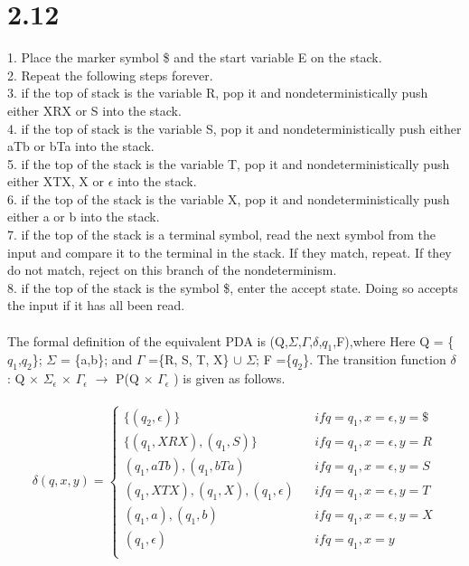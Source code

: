 \documentclass{scrartcl}
\begin{document}
\section*{2.12}
1. Place the marker symbol \$ and the start variable E on the stack.\\
2. Repeat the following steps forever. \\
3. if the top of stack is the variable R, pop it and nondeterministically push either XRX or S into the stack.\\
4. if the top of stack is the variable S, pop it and nondeterministically push either aTb or bTa into the stack.\\ 
5. if the top of the stack is the variable T, pop it and nondeterministically push either XTX, X or $\epsilon$ into the stack.\\
6. if the top of the stack is the variable X, pop it and nondeterministically push either a or b into the stack.\\
7. if the top of the stack is a terminal symbol, read the next symbol from the input and compare it to the terminal in the stack. If they match, repeat. If they do not match, reject on this branch of the nondeterminism.\\
8. if the top of the stack is the symbol \$, enter the accept state. Doing so accepts the input if it has all been read.\\
\\

The formal definition of the equivalent PDA is (Q,$\Sigma$,$\Gamma$,$\delta$,$q_1$,F),where Here Q = \{$q_1$,$q_2$\}; $\Sigma$ = \{a,b\}; and $\Gamma$ =\{R, S, T, X\} $\cup$ $\Sigma$; F =\{$q_2$\}. The transition function $\delta$ : Q $\times$ ${\Sigma}_\epsilon$  $\times$ $\Gamma_\epsilon$ $\rightarrow$ P(Q $\times$ $\Gamma_\epsilon$ ) is given as follows.\\
\\
\begin{equation}
{\delta}(q,x,y)=\left\{
\begin{array}{rcl}
\{(q_2,\epsilon)\} & & { if q=q_1,x=\epsilon, y=\$}\\
\{(q_1, XRX),(q_1, S)\} & & {if q=q_1,x=\epsilon,y=R}\\
{(q_1, aTb), (q_1, bTa)} & 	& {if q=q_1, x=\epsilon,y=S}\\
{(q_1, XTX),(q_1, X), (q_1, \epsilon)} & & {if q=q_1,x=\epsilon,y=T}\\
{(q_1, a),(q_1, b)} & & {if q=q_1,x=\epsilon, y=X}\\
{(q_1, \epsilon)} & & {if q=q_1,x=y}\\
\end{array} \right.
\end{equation}
\end{document}
